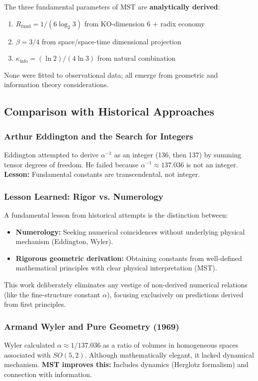 \documentclass[11pt, a4paper]{article}
\theoremstyle{plain}
\theoremstyle{definition}
\newcommand{\Rfactor}{R_{\text{fund}}}
\newcommand{\Kinfo}{\kappa_{\text{info}}}
\begin{document}
The three fundamental parameters of MST are \textbf{analytically derived}:
\begin{enumerate}
    \item $\Rfactor = 1/(6\log_2 3)$ from KO-dimension 6 + radix economy
    \item $\beta = 3/4$ from space/space-time dimensional projection
    \item $\Kinfo = (\ln 2)/(4\ln 3)$ from natural combination
\end{enumerate}

None were fitted to observational data; all emerge from geometric and information theory considerations.

\subsection{Comparison with Historical Approaches}

\subsubsection{Arthur Eddington and the Search for Integers}
Eddington attempted to derive $\alpha^{-1}$ as an integer (136, then 137) by summing tensor degrees of freedom. He failed because $\alpha^{-1} \approx 137.036$ is not an integer. \textbf{Lesson:} Fundamental constants are transcendental, not integer.

\subsubsection{Lesson Learned: Rigor vs. Numerology}
A fundamental lesson from historical attempts is the distinction between:
\begin{itemize}
    \item \textbf{Numerology:} Seeking numerical coincidences without underlying physical mechanism (Eddington, Wyler).
    \item \textbf{Rigorous geometric derivation:} Obtaining constants from well-defined mathematical principles with clear physical interpretation (MST).
\end{itemize}
This work deliberately eliminates any vestige of non-derived numerical relations (like the fine-structure constant $\alpha$), focusing exclusively on predictions derived from first principles.

\subsubsection{Armand Wyler and Pure Geometry (1969)}
Wyler calculated $\alpha \approx 1/137.036$ as a ratio of volumes in homogeneous spaces associated with $SO(5,2)$. Although mathematically elegant, it lacked dynamical mechanism. \textbf{MST improves this:} Includes dynamics (Herglotz formalism) and connection with information.
\end{document}
